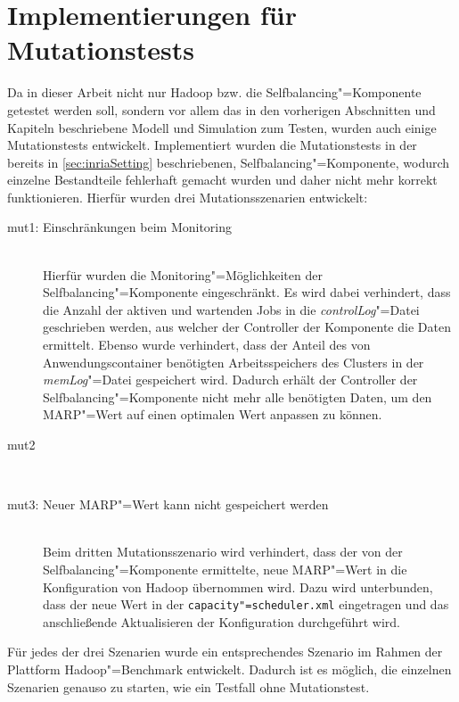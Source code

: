 \section{Implementierungen für Mutationstests}
\label{sec:implMutationTests}

Da in dieser Arbeit nicht nur Hadoop bzw. die Selfbalancing"=Komponente getestet werden soll, sondern vor allem das in den vorherigen Abschnitten und Kapiteln beschriebene Modell und Simulation zum Testen, wurden auch einige Mutationstests entwickelt.
Implementiert wurden die Mutationstests in der bereits in \autoref{sec:inriaSetting} beschriebenen, Selfbalancing"=Komponente, wodurch einzelne Bestandteile fehlerhaft gemacht wurden und daher nicht mehr korrekt funktionieren.
Hierfür wurden drei Mutationsszenarien entwickelt:

\begin{description}
    \item [mut1: Einschränkungen beim Monitoring] \hfill \\
        Hierfür wurden die Monitoring"=Möglichkeiten der Selfbalancing"=Komponente eingeschränkt.
        Es wird dabei verhindert, dass die Anzahl der aktiven und wartenden Jobs in die \emph{controlLog}"=Datei geschrieben werden, aus welcher der Controller der Komponente die Daten ermittelt.
        Ebenso wurde verhindert, dass der Anteil des von Anwendungscontainer benötigten Arbeitsspeichers des Clusters in der \emph{memLog}"=Datei gespeichert wird.
        Dadurch erhält der Controller der Selfbalancing"=Komponente nicht mehr alle benötigten Daten, um den \ac{MARP}"=Wert auf einen optimalen Wert anpassen zu können.
    \item [mut2] \hfill \\
        
    \item [mut3: Neuer MARP"=Wert kann nicht gespeichert werden] \hfill \\
        Beim dritten Mutationsszenario wird verhindert, dass der von der Selfbalancing"=Komponente ermittelte, neue MARP"=Wert in die Konfiguration von Hadoop übernommen wird.
        Dazu wird unterbunden, dass der neue Wert in der \texttt{capacity"=scheduler.xml} eingetragen und das anschließende Aktualisieren der Konfiguration durchgeführt wird.
\end{description}

Für jedes der drei Szenarien wurde ein entsprechendes Szenario im Rahmen der Plattform Hadoop"=Benchmark entwickelt.
Dadurch ist es möglich, die einzelnen Szenarien genauso zu starten, wie ein Testfall ohne Mutationstest.
